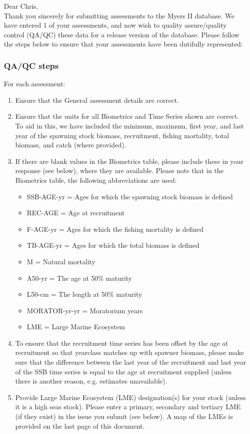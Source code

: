 \documentclass [a4paper, 10pt] {article}
\begin{document}
\noindent Dear Chris,\\

\noindent Thank you sincerely for submitting assessments to the Myers II database. We have entered 1 of your assessments, and now wish to quality assure/quality control (QA/QC) these data for a release version of the database. Please follow the steps below to ensure that your assessments have been dutifully represented:
\subsubsection{QA/QC steps}
For each assessment:
\begin{enumerate}
\item Ensure that the General assessment details are correct.
\item Ensure that the units for all Biometrics and Time Series shown are correct. To aid in this, we have included the minimum, maximum, first year, and last year of the spawning stock biomass, recruitment, fishing mortality, total biomass, and  catch  (where provided). 
\item If there are blank values in the Biometrics table, please include these in your response (see below), where they are available.
Please note that in the Biometrics table, the following abbreviations are used:
\begin{itemize}
\item SSB-AGE-yr  = Ages for which the spawning stock biomass is defined
\item REC-AGE     = Age at recruitment
\item F-AGE-yr    = Ages for which the fishing mortality is defined 
\item TB-AGE-yr   = Ages for which the total biomass is defined
\item M      = Natural mortality
\item A50-yr      = The age at 50\% maturity
\item L50-cm      = The length at 50\% maturity
\item MORATOR-yr-yr = Moratorium years
\item LME = Large Marine Ecosystem\\
\end{itemize}
\item To ensure that the recruitment time series has been offset by the age at recruitment so that yearclass matches up with spawner biomass, please make sure that the difference between the last year of the recruitment and last year of the SSB time series is equal to the age at recruitment supplied (unless there is another reason, e.g. estimates unavailable). 
\item Provide Large Marine Ecosystem (LME) designation(s) for your stock (unless it is a high seas stock). Please enter a primary, secondary and tertiary LME (if they exist) in the issue you submit (see below). A map of the LMEs is provided on the last page of this document. 
\end{enumerate}
\vspace{-.25in}
\end{document}
